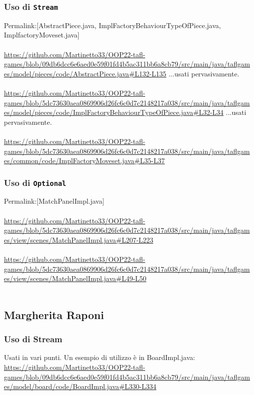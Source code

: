 \documentclass[a4paper,12pt]{report}
\begin{document}
\subsubsection{Uso di \texttt{Stream}}
Permalink:[AbstractPiece.java, ImplFactoryBehaviourTypeOfPiece.java, ImplfactoryMoveset.java]\\\\
\url{https://github.com/Martinetto33/OOP22-tafl-games/blob/09db6dcc6e6aed0e59f01fd4b5ac311bb6a8cb79/src/main/java/taflgames/model/pieces/code/AbstractPiece.java#L132-L135}
...usati pervasivamente.\\\\
\url{https://github.com/Martinetto33/OOP22-tafl-games/blob/5dc73630aea0869906d26fc6c0d7c2148217a038/src/main/java/taflgames/model/pieces/code/ImplFactoryBehaviourTypeOfPiece.java#L32-L34}
...usati pervasivamente.\\\\
\url{https://github.com/Martinetto33/OOP22-tafl-games/blob/5dc73630aea0869906d26fc6c0d7c2148217a038/src/main/java/taflgames/common/code/ImplFactoryMoveset.java#L35-L37}

\subsubsection{Uso di \texttt{Optional}}
Permalink:[MatchPanelImpl.java]\\\\
\url{https://github.com/Martinetto33/OOP22-tafl-games/blob/5dc73630aea0869906d26fc6c0d7c2148217a038/src/main/java/taflgames/view/scenes/MatchPanelImpl.java#L207-L223}\\\\
\url{https://github.com/Martinetto33/OOP22-tafl-games/blob/5dc73630aea0869906d26fc6c0d7c2148217a038/src/main/java/taflgames/view/scenes/MatchPanelImpl.java#L49-L50}\\\\

\subsection{Margherita Raponi}

\subsubsection{Uso di Stream}
Usati in vari punti. Un esempio di utilizzo è in BoardImpl.java: \url{https://github.com/Martinetto33/OOP22-tafl-games/blob/09db6dcc6e6aed0e59f01fd4b5ac311bb6a8cb79/src/main/java/taflgames/model/board/code/BoardImpl.java#L330-L334}
\end{document}
